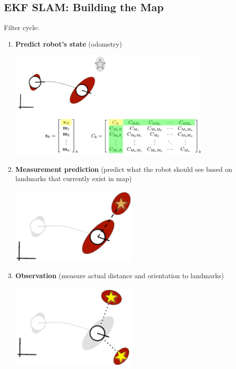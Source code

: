 \documentclass[10pt]{article}
\begin{document}
\subsection*{EKF SLAM: Building the Map}
Filter cycle:
\begin{enumerate}
    \item \textbf{Predict robot's state} (odometry)
    \begin{center} 
        \includegraphics*[width=0.8\textwidth]{L2_12.png} 
    \end{center}
    \item \textbf{Measurement prediction} (predict what the robot should see based on landmarks that currently exist in map)
    \begin{center} 
        \includegraphics*[width=0.5\textwidth]{L2_13.png} 
    \end{center}
    \item \textbf{Observation} (measure actual distance and orientation to landmarks)
    \begin{center} 
        \includegraphics*[width=0.5\textwidth]{L2_14.png} 
    \end{center}

\end{enumerate}
\end{document}

